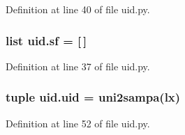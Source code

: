 Definition at line 40 of file uid.\+py.

\hypertarget{namespaceuid_ae6f932fe5ea3081fc75207a773dc3c0f}{
\subsubsection[{sf}]{\setlength{\rightskip}{0pt plus 5cm}list uid.\+sf = \mbox{[}$\,$\mbox{]}}}\label{namespaceuid_ae6f932fe5ea3081fc75207a773dc3c0f}


Definition at line 37 of file uid.\+py.

\hypertarget{namespaceuid_a41f0a6fb6938bc67f4ab035ac008504c}{
\subsubsection[{uid}]{\setlength{\rightskip}{0pt plus 5cm}tuple uid.\+uid = uni2sampa({\bf lx})}}\label{namespaceuid_a41f0a6fb6938bc67f4ab035ac008504c}


Definition at line 52 of file uid.\+py.

